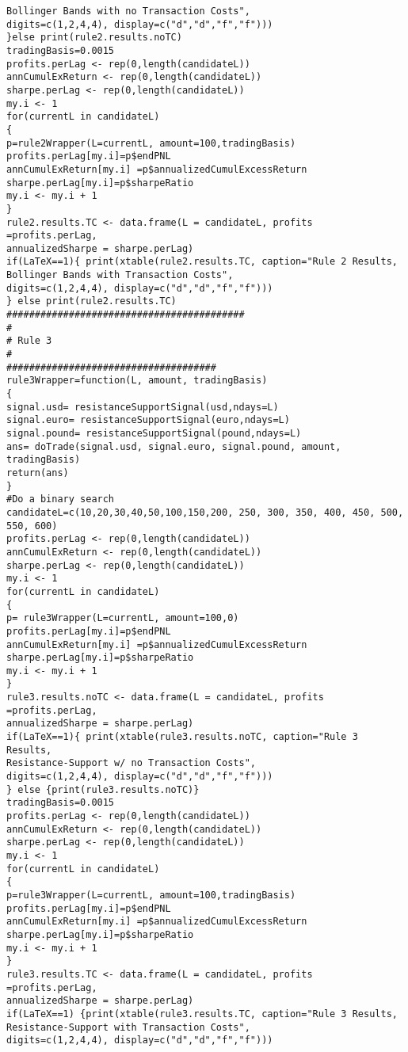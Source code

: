 \begin{small}
\begin{lstlisting}
Bollinger Bands with no Transaction Costs",
digits=c(1,2,4,4), display=c("d","d","f","f")))
}else print(rule2.results.noTC)
tradingBasis=0.0015
profits.perLag <- rep(0,length(candidateL))
annCumulExReturn <- rep(0,length(candidateL))
sharpe.perLag <- rep(0,length(candidateL))
my.i <- 1
for(currentL in candidateL)
{
p=rule2Wrapper(L=currentL, amount=100,tradingBasis)
profits.perLag[my.i]=p$endPNL
annCumulExReturn[my.i] =p$annualizedCumulExcessReturn
sharpe.perLag[my.i]=p$sharpeRatio
my.i <- my.i + 1
}
rule2.results.TC <- data.frame(L = candidateL, profits =profits.perLag,
annualizedSharpe = sharpe.perLag)
if(LaTeX==1){ print(xtable(rule2.results.TC, caption="Rule 2 Results, 
Bollinger Bands with Transaction Costs",
digits=c(1,2,4,4), display=c("d","d","f","f")))
} else print(rule2.results.TC)
##########################################
#
# Rule 3
#
#####################################
rule3Wrapper=function(L, amount, tradingBasis)
{
signal.usd= resistanceSupportSignal(usd,ndays=L)
signal.euro= resistanceSupportSignal(euro,ndays=L)
signal.pound= resistanceSupportSignal(pound,ndays=L)
ans= doTrade(signal.usd, signal.euro, signal.pound, amount, tradingBasis)
return(ans)
}
#Do a binary search
candidateL=c(10,20,30,40,50,100,150,200, 250, 300, 350, 400, 450, 500, 550, 600)
profits.perLag <- rep(0,length(candidateL))
annCumulExReturn <- rep(0,length(candidateL))
sharpe.perLag <- rep(0,length(candidateL))
my.i <- 1
for(currentL in candidateL)
{
p= rule3Wrapper(L=currentL, amount=100,0)
profits.perLag[my.i]=p$endPNL
annCumulExReturn[my.i] =p$annualizedCumulExcessReturn
sharpe.perLag[my.i]=p$sharpeRatio
my.i <- my.i + 1
}
rule3.results.noTC <- data.frame(L = candidateL, profits =profits.perLag,
annualizedSharpe = sharpe.perLag)
if(LaTeX==1){ print(xtable(rule3.results.noTC, caption="Rule 3 Results, 
Resistance-Support w/ no Transaction Costs",
digits=c(1,2,4,4), display=c("d","d","f","f")))
} else {print(rule3.results.noTC)}
tradingBasis=0.0015
profits.perLag <- rep(0,length(candidateL))
annCumulExReturn <- rep(0,length(candidateL))
sharpe.perLag <- rep(0,length(candidateL))
my.i <- 1
for(currentL in candidateL)
{
p=rule3Wrapper(L=currentL, amount=100,tradingBasis)
profits.perLag[my.i]=p$endPNL
annCumulExReturn[my.i] =p$annualizedCumulExcessReturn
sharpe.perLag[my.i]=p$sharpeRatio
my.i <- my.i + 1
}
rule3.results.TC <- data.frame(L = candidateL, profits =profits.perLag,
annualizedSharpe = sharpe.perLag)
if(LaTeX==1) {print(xtable(rule3.results.TC, caption="Rule 3 Results, 
Resistance-Support with Transaction Costs",
digits=c(1,2,4,4), display=c("d","d","f","f")))

\end{lstlisting}
\end{small}

